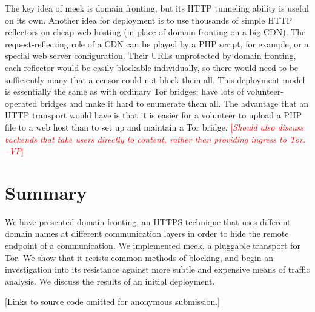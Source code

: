 \documentclass{sig-alternate}
\newcommand{\meekserver}{\mbox{meek-server}\xspace}
\newcommand{\meek}{meek\xspace}
\newcommand{\note}[1]{{\textcolor{red}{[\textit{#1}]}}}
\newcommand{\vp}[1]{\note{#1 --VP}}
\begin{document}

The key idea of \meek is domain fronting,
but its HTTP tunneling ability is useful on its own.
Another idea for deployment is to use
thousands of simple HTTP reflectors on cheap web hosting
(in place of domain fronting on a big CDN).
The request-reflecting role of a CDN can
be played by a PHP script, for example,
or a special web server configuration.
Their URLs unprotected by domain fronting,
each reflector would be easily blockable individually,
so there would need to be sufficiently many that
a censor could not block them all.
This deployment model is essentially the same as with
ordinary Tor bridges: have lots of volunteer-operated bridges
and make it hard to enumerate them all.
The advantage that an HTTP transport would have
is that it is easier for a volunteer to upload a PHP file to a web host
than to set up and maintain a Tor bridge.
\vp{Should also discuss backends that take users directly to content,
rather than providing ingress to Tor.}

\section{Summary}
\label{sec:summary}

We have presented domain fronting,
an HTTPS technique that uses different domain names
at different communication layers in
order to hide the remote endpoint of a communication.
We implemented \meek,
a pluggable transport for Tor.
We show that it resists common methods of blocking,
and begin an investigation into its
resistance against more subtle and expensive means of traffic analysis.
We discuss the results of an initial deployment.

[Links to source code omitted for anonymous submission.]

\end{document}
